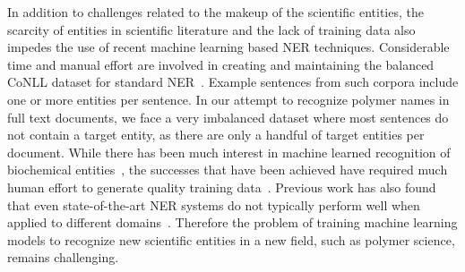 
In addition to challenges related to the makeup of the scientific entities, the scarcity of entities in scientific literature and the lack of training data also impedes the use of recent machine learning based NER techniques.
Considerable time and manual effort are involved in creating and maintaining the balanced
CoNLL dataset for standard NER~\cite{tjong2003introduction}.
Example sentences from such corpora include one or more entities per sentence. 
In our attempt to recognize polymer names in full text documents, we face a very imbalanced dataset where most sentences do not contain a target entity, as there are only a handful of target entities per document.
While there has been much interest in machine learned recognition of biochemical entities~\cite{jessop2011oscar4,rocktaschel2012chemspot,leaman2015tmchem,swain2016chemdataextractor}, 
the successes that have been achieved have required much human effort to generate quality training data~\cite{krallinger2015chemdner}.
Previous work has also found that even state-of-the-art NER systems do
not typically perform well when applied to different domains~\cite{krallinger2013overview}. 
Therefore the problem of training machine learning models to recognize new scientific entities in a new field, such as polymer science, remains challenging.

